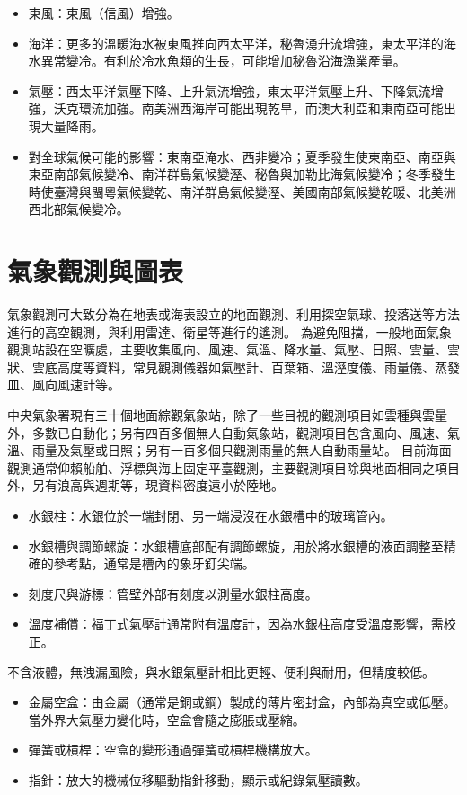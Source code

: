 \documentclass[a4paper,12pt]{report}
\begin{document}
\begin{itemize}
\begin{itemize}
  \item 東風：東風（信風）增強。
  \item 海洋：更多的溫暖海水被東風推向西太平洋，秘魯湧升流增強，東太平洋的海水異常變冷。有利於冷水魚類的生長，可能增加秘魯沿海漁業產量。
  \item 氣壓：西太平洋氣壓下降、上升氣流增強，東太平洋氣壓上升、下降氣流增強，沃克環流加強。南美洲西海岸可能出現乾旱，而澳大利亞和東南亞可能出現大量降雨。
  \item 對全球氣候可能的影響：東南亞淹水、西非變冷；夏季發生使東南亞、南亞與東亞南部氣候變冷、南洋群島氣候變溼、秘魯與加勒比海氣候變冷；冬季發生時使臺灣與閩粵氣候變乾、南洋群島氣候變溼、美國南部氣候變乾暖、北美洲西北部氣候變冷。
\end{itemize}
\section{氣象觀測與圖表}
氣象觀測可大致分為在地表或海表設立的地面觀測、利用探空氣球、投落送等方法進行的高空觀測，與利用雷達、衛星等進行的遙測。
為避免阻擋，一般地面氣象觀測站設在空曠處，主要收集風向、風速、氣溫、降水量、氣壓、日照、雲量、雲狀、雲底高度等資料，常見觀測儀器如氣壓計、百葉箱、溫溼度儀、雨量儀、蒸發皿、風向風速計等。

中央氣象署現有三十個地面綜觀氣象站，除了一些目視的觀測項目如雲種與雲量外，多數已自動化；另有四百多個無人自動氣象站，觀測項目包含風向、風速、氣溫、雨量及氣壓或日照；另有一百多個只觀測雨量的無人自動雨量站。
目前海面觀測通常仰賴船舶、浮標與海上固定平臺觀測，主要觀測項目除與地面相同之項目外，另有浪高與週期等，現資料密度遠小於陸地。
\begin{itemize}
\item 水銀柱：水銀位於一端封閉、另一端浸沒在水銀槽中的玻璃管內。
\item 水銀槽與調節螺旋：水銀槽底部配有調節螺旋，用於將水銀槽的液面調整至精確的參考點，通常是槽內的象牙釘尖端。
\item 刻度尺與游標：管壁外部有刻度以測量水銀柱高度。
\item 溫度補償：福丁式氣壓計通常附有溫度計，因為水銀柱高度受溫度影響，需校正。
\end{itemize}
不含液體，無洩漏風險，與水銀氣壓計相比更輕、便利與耐用，但精度較低。
\begin{itemize}
\item 金屬空盒：由金屬（通常是銅或鋼）製成的薄片密封盒，內部為真空或低壓。當外界大氣壓力變化時，空盒會隨之膨脹或壓縮。
\item 彈簧或槓桿：空盒的變形通過彈簧或槓桿機構放大。
\item 指針：放大的機械位移驅動指針移動，顯示或紀錄氣壓讀數。
\end{itemize}

\end{itemize}
\end{document}
